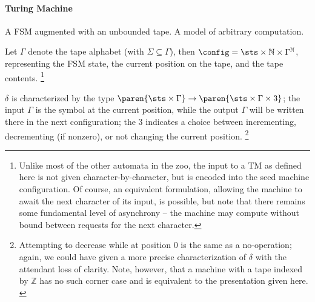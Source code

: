 \paragraph{Turing Machine}
A FSM augmented with an unbounded tape.  A model of arbitrary computation.

Let $\Gamma$ denote the tape alphabet (with $\Sigma \subseteq \Gamma$), then
$\config = \sts \times \mathbb{N} \times \Gamma^\mathbb{N}$, representing
the FSM state, the current position on the tape, and the tape contents.%
%
\footnote{Unlike most of the other automata in the zoo, the input to a TM as
defined here is not given character-by-character, but is encoded into the
seed machine configuration.  Of course, an equivalent formulation, allowing
the machine to await the next character of its input, is possible, but note
that there remains some fundamental level of asynchrony -- the machine may
compute without bound between requests for the next character.}

$\delta$ is characterized by the type $\paren{\sts \times \Gamma} \to
\paren{\sts \times \Gamma \times 3}$; the input $\Gamma$ is the symbol at
the current position, while the output $\Gamma$ will be written there in the
next configuration; the $3$ indicates a choice between incrementing,
decrementing (if nonzero), or not changing the current position.%
%
\footnote{Attempting to decrease while at position $0$ is the same as a
no-operation; again, we could have given a more precise characterization of
$\delta$ with the attendant loss of clarity.  Note, however, that a machine
with a tape indexed by $\mathbb{Z}$ has no such corner case and is equivalent
to the presentation given here. \cite{post:1936}}

